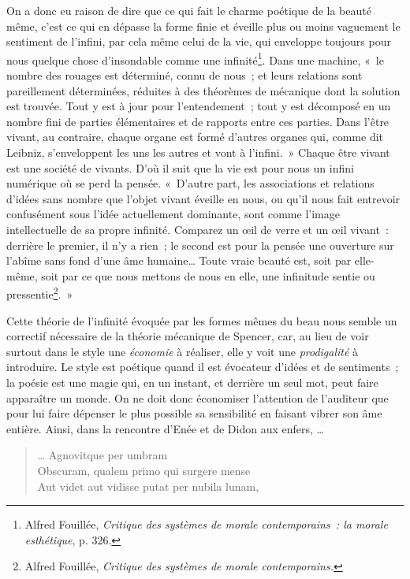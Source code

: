 \documentclass[french,twoside]{book} %
\begin{document}
On a donc eu raison de dire que ce qui fait le charme poétique de la beauté même, c’est ce qui en dépasse la forme finie et éveille plus ou moins vaguement le sentiment de l’infini, par cela même celui de la vie, qui enveloppe toujours pour nous quelque chose d’insondable comme une infinité\footnote{ Alfred Fouillée, \emph{Critique des systèmes de morale contemporains : la morale esthétique}, p. 326.}. Dans une machine, « le nombre des rouages est déterminé, connu de nous ; et leurs relations sont pareillement déterminées, réduites à des théorèmes de mécanique dont la solution est trouvée. Tout y est à jour pour l’entendement ; tout y est décomposé en un nombre fini de parties élémentaires et de rapports entre ces parties. Dans l’être vivant, au contraire, chaque organe est formé d’autres organes qui, comme dit Leibniz, s’enveloppent les uns les autres et vont à l’infini. » Chaque être vivant est une société de vivants. D’où il suit que la vie est pour nous un infini numérique où se perd la pensée. « D’autre part, les associations et relations d’idées sans nombre que l’objet vivant éveille en nous, ou qu’il nous fait entrevoir confusément sous l’idée actuellement dominante, sont comme l’image intellectuelle de sa propre infinité. Comparez un œil de verre et un œil vivant : derrière le premier, il n’y a rien ; le second est pour la pensée une ouverture sur l’abîme sans fond d’une âme humaine… Toute vraie beauté est, soit par elle-même, soit par ce que nous mettons de nous en elle, une infinitude sentie ou pressentie\footnote{ Alfred Fouillée, \emph{Critique des systèmes de morale contemporains.}}. »\par
Cette théorie de l’infinité évoquée par les formes mêmes du beau nous semble un correctif nécessaire de la théorie mécanique de Spencer, car, au lieu de voir surtout dans le style une \emph{économie} à réaliser, elle y voit une \emph{prodigalité} à introduire. Le style est poétique quand il est évocateur d’idées et de sentiments ; la poésie est une magie qui, en un instant, et derrière un seul mot, peut faire apparaître un monde. On ne doit donc économiser l’attention de l’auditeur que pour lui faire dépenser le plus possible sa sensibilité en faisant vibrer son âme entière. Ainsi, dans la rencontre d’Enée et de Didon aux enfers, …\par


\begin{verse}
… Agnovitque per umbram\\
Obscuram, qualem primo qui surgere mense\\
Aut videt aut vidisse putat per nubila lunam,\\
\end{verse}
\end{document}
